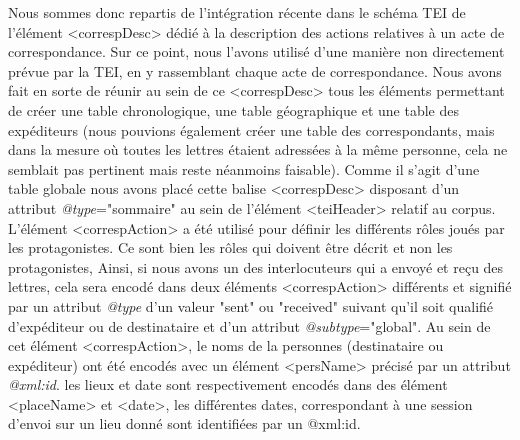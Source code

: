 \documentclass[12pt,a4paper]{book} %
\begin{document}
Nous sommes donc repartis de l'intégration récente dans le schéma TEI de l'élément <correspDesc> dédié à la description des actions relatives à un acte de correspondance. Sur ce point, nous l'avons utilisé d'une manière non directement prévue par la TEI, en y rassemblant chaque acte de correspondance. Nous avons fait en sorte de réunir au sein de ce <correspDesc> tous les éléments permettant de créer une table chronologique, une table géographique et une table des expéditeurs (nous pouvions également créer une table des correspondants, mais dans la mesure où toutes les lettres étaient adressées à la même personne, cela ne semblait pas pertinent mais reste néanmoins faisable). Comme il s'agit d'une table globale nous avons placé cette balise <correspDesc> disposant d'un attribut \textit{@type}="sommaire" au sein de l'élément <teiHeader> relatif au corpus. L'élément <correspAction> a été utilisé pour définir les différents rôles joués par les protagonistes. Ce sont bien les rôles qui doivent être décrit et non les protagonistes, Ainsi, si nous avons un des interlocuteurs qui a envoyé et reçu des lettres, cela sera encodé dans deux éléments <correspAction> différents et signifié par un attribut \textit{@type} d'un valeur "sent" ou "received" suivant qu'il soit qualifié d'expéditeur ou de destinataire et d'un attribut \textit{@subtype}="global". Au sein de cet élément <correspAction>, le noms de la personnes (destinataire ou expéditeur) ont été  encodés avec un élément <persName> précisé par un attribut \textit{@xml:id}. les lieux et date sont respectivement encodés dans des élément <placeName> et <date>, les différentes dates, correspondant à une session d'envoi sur un lieu donné sont identifiées par un @xml:id.
\bigskip
\end{document}
